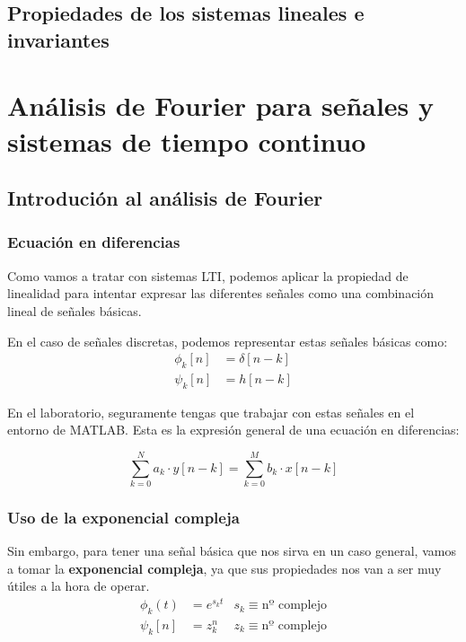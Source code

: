 \documentclass[a4paper]{book}
\begin{document}
\section{Propiedades de los sistemas lineales e invariantes}





\chapter{Análisis de Fourier para señales y sistemas de tiempo continuo}

\section{Introdución al análisis de Fourier}
\subsection{Ecuación en diferencias}

Como vamos a tratar con sistemas LTI, podemos aplicar la propiedad de linealidad para intentar expresar las diferentes señales como una combinación lineal de señales básicas.

En el caso de señales discretas, podemos representar estas señales básicas como:
\begin{align*}
	\phi_k[n]  & = \delta [n-k] \\
	\psi _k[n] & = h[n-k]
\end{align*}

En el laboratorio, seguramente tengas que trabajar con estas señales en el entorno de MATLAB. Esta es la expresión general de una ecuación en diferencias:

\[\sum^{N}_{k=0}{a_k\cdot y[n-k]} = \sum^{M}_{k=0}{b_k\cdot x[n-k]}\]

\subsection{Uso de la exponencial compleja}

Sin embargo, para tener una señal básica que nos sirva en un caso general, vamos a tomar la \textbf{exponencial compleja}, ya que sus propiedades nos van a ser muy útiles a la hora de operar.
\begin{align*}
	 &  &  &  &  &  &  &  & \phi_k(t)  & = e^{s_kt} & s_k \equiv \text{nº complejo} &  &  &  &  &  &  &  & \\
	 &  &  &  &  &  &  &  & \psi _k[n] & = z_k^n    & z_k \equiv \text{nº complejo} &  &  &  &  &  &  &  &
\end{align*}
\end{document}
